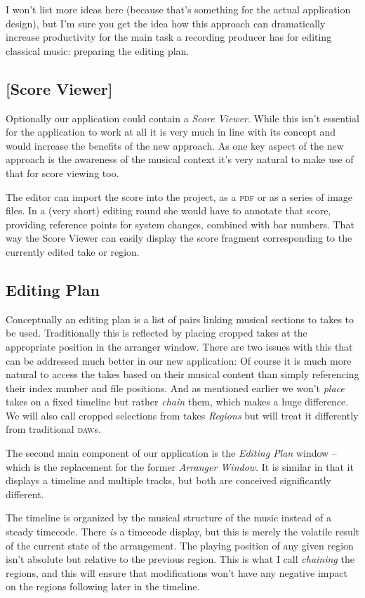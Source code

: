 \documentclass[11pt,a4paper]{article}
\begin{document}
I won't list more ideas here (because that's something for the actual application design), but I'm sure you get the idea how this approach can dramatically increase productivity for the main task a recording producer has for editing classical music: preparing the editing plan.

\subsection{[Score Viewer]}
Optionally our application could contain a \emph{Score Viewer}.
While this isn't essential for the application to work at all it is very much in line with its concept and would increase the benefits of the new approach.
As one key aspect of the new approach is the awareness of the musical context it's very natural to make use of that for score viewing too.

The editor can import the score into the project, as a \textsc{pdf} or as a series of image files.
In a (very short) editing round she would have to annotate that score, providing reference points for system changes, combined with bar numbers.
That way the Score Viewer can easily display the score fragment corresponding to the currently edited take or region.

\subsection{Editing Plan}
Conceptually an editing plan is a list of pairs linking musical sections to takes to be used.
Traditionally this is reflected by placing cropped takes at the appropriate position in the arranger window.
There are two issues with this that can be addressed much better in our new application:
Of course it is much more natural to access the takes based on their musical content than simply referencing their index number and file positions.
And as mentioned earlier we won't \emph{place} takes on a fixed timeline but rather \emph{chain} them, which makes a huge difference.
We will also call cropped selections from takes \emph{Regions} but will treat it differently from traditional \textsc{daw}s.

\medskip
The second main component of our application is the \emph{Editing Plan} window -- which is the replacement for the former \emph{Arranger Window}.
It is similar in that it displays a timeline and multiple tracks, but both are conceived significantly different.

The timeline is organized by the musical structure of the music instead of a steady timecode.
There \emph{is} a timecode display, but this is merely the volatile result of the current state of the arrangement.
The playing position of any given region isn't absolute but relative to the previous region.
This is what I call \emph{chaining} the regions, and this will ensure that modifications won't have any negative impact on the regions following later in the timeline.
\end{document}
